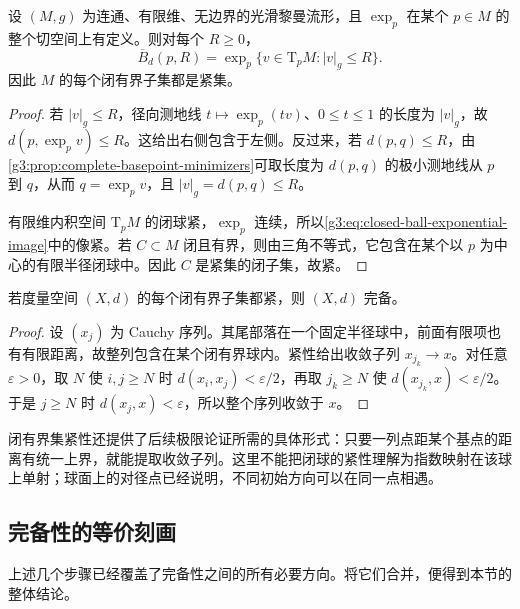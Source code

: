 \begin{proposition}\label{g3:prop:complete-basepoint-proper}
	设 \((M,g)\) 为连通、有限维、无边界的光滑黎曼流形，且 \(\exp_p\) 在某个 \(p\in M\) 的整个切空间上有定义。则对每个 \(R\ge0\)，
	\begin{equation}\label{g3:eq:closed-ball-exponential-image}
		\overline B_d(p,R)
		=\exp_p\{v\in\mathrm T_pM:|v|_g\le R\}.
	\end{equation}
	因此 \(M\) 的每个闭有界子集都是紧集。
\end{proposition}
\begin{proof}
	若 \(|v|_g\le R\)，径向测地线 \(t\mapsto\exp_p(tv)\)、\(0\le t\le1\) 的长度为 \(|v|_g\)，故 \(d(p,\exp_pv)\le R\)。这给出右侧包含于左侧。反过来，若 \(d(p,q)\le R\)，由\cref{g3:prop:complete-basepoint-minimizers}可取长度为 \(d(p,q)\) 的极小测地线从 \(p\) 到 \(q\)，从而 \(q=\exp_pv\)，且 \(|v|_g=d(p,q)\le R\)。

	有限维内积空间 \(\mathrm T_pM\) 的闭球紧，\(\exp_p\) 连续，所以\eqref{g3:eq:closed-ball-exponential-image}中的像紧。若 \(C\subset M\) 闭且有界，则由三角不等式，它包含在某个以 \(p\) 为中心的有限半径闭球中。因此 \(C\) 是紧集的闭子集，故紧。
\end{proof}

\begin{lemma}\label{g3:lem:proper-metric-complete}
	若度量空间 \((X,d)\) 的每个闭有界子集都紧，则 \((X,d)\) 完备。
\end{lemma}
\begin{proof}
	设 \((x_j)\) 为 Cauchy 序列。其尾部落在一个固定半径球中，前面有限项也有有限距离，故整列包含在某个闭有界球内。紧性给出收敛子列 \(x_{j_k}\rightarrow x\)。对任意 \(\varepsilon>0\)，取 \(N\) 使 \(i,j\ge N\) 时 \(d(x_i,x_j)<\varepsilon/2\)，再取 \(j_k\ge N\) 使 \(d(x_{j_k},x)<\varepsilon/2\)。于是 \(j\ge N\) 时 \(d(x_j,x)<\varepsilon\)，所以整个序列收敛于 \(x\)。
\end{proof}

闭有界集紧性还提供了后续极限论证所需的具体形式：只要一列点距某个基点的距离有统一上界，就能提取收敛子列。这里不能把闭球的紧性理解为指数映射在该球上单射；球面上的对径点已经说明，不同初始方向可以在同一点相遇。

\subsection{完备性的等价刻画}
\label{g3:subsec:0203:04}
上述几个步骤已经覆盖了完备性之间的所有必要方向。将它们合并，便得到本节的整体结论。

